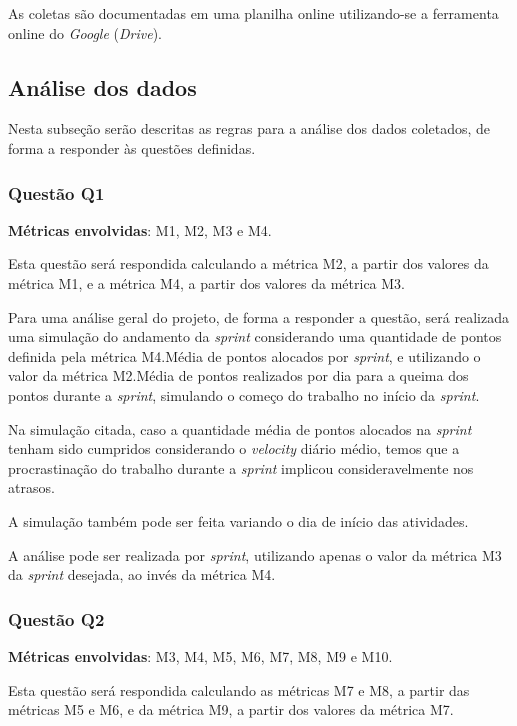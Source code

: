       As coletas são documentadas em uma planilha online utilizando-se a ferramenta online do \textit{Google} (\textit{Drive}).

      \subsection{Análise dos dados}

      	Nesta subseção serão descritas as regras para a análise dos dados coletados, de forma a responder às questões definidas.

      	\subsubsection{Questão Q1}

      		\textbf{Métricas envolvidas}: M1, M2, M3 e M4.

      		Esta questão será respondida calculando a métrica M2, a partir dos valores da métrica M1, e a métrica M4, a partir dos valores
      		da métrica M3.

      		Para uma análise geral do projeto, de forma a responder a questão, será realizada uma simulação do andamento da \textit{sprint} considerando uma quantidade de
      		pontos definida pela métrica M4.Média de pontos alocados por \textit{sprint}, e utilizando o valor da métrica M2.Média de pontos realizados por dia para a queima dos pontos durante a \textit{sprint}, simulando o começo do trabalho no início da \textit{sprint}.

      		Na simulação citada, caso a quantidade média de pontos alocados na \textit{sprint} tenham sido cumpridos considerando
      		o \textit{velocity} diário médio, temos que a procrastinação do trabalho durante a \textit{sprint} implicou
      		consideravelmente nos atrasos.

      		A simulação também pode ser feita variando o dia de início das atividades.

      		A análise pode ser realizada por \textit{sprint}, utilizando apenas o valor da métrica M3 da \textit{sprint} desejada, ao invés da métrica M4.

  		\subsubsection{Questão Q2}

  			\textbf{Métricas envolvidas}: M3, M4, M5, M6, M7, M8, M9 e M10.
 
  			Esta questão será respondida calculando as métricas M7 e M8, a partir das métricas M5 e M6, e da métrica M9, a partir dos
  			valores da métrica M7.

